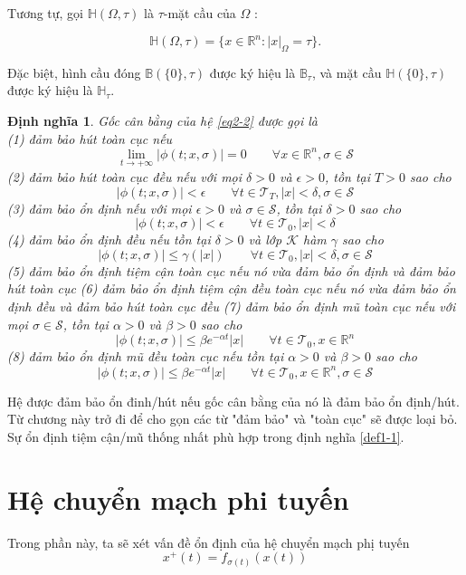 \documentclass[14pt,a4paper,oneside]{report}		%
\newtheorem{define}[theorem]{Định nghĩa}
\begin{document}
Tương tự, gọi $\mathbb{H}(\Omega,\tau)$ là $\tau$-mặt cầu của $\Omega$ :

$$\mathbb{H}(\Omega,\tau)=\{x\in\mathbb{R}^n:|x|_\Omega=\tau\}.$$

Đặc biệt, hình cầu đóng $\mathbb{B}(\{0\},\tau)$ được ký hiệu là $\mathbb{B}_\tau$, và mặt cầu $\mathbb{H}(\{0\},\tau)$ được ký hiệu là $\mathbb{H}_\tau$.

\begin{define}
Gốc cân bằng của hệ \ref{eq2-2} được gọi là\\
(1) đảm bảo hút toàn cục nếu
$$\lim_{t\rightarrow +\infty}|\phi (t;x,\sigma)|=0\qquad\forall x\in\mathbb{R}^n, \sigma\in\mathcal{S}$$
(2) đảm bảo hút toàn cục đều nếu với mọi $\delta >0$ và $\epsilon >0$, tồn tại $T>0$ sao cho
$$|\phi (t;x,\sigma)|<\epsilon\qquad\forall t\in\mathcal{T}_T, |x|<\delta,\sigma\in\mathcal{S}$$
(3) đảm bảo ổn định nếu với mọi $\epsilon > 0$ và $\sigma\in\mathcal{S}$, tồn tại $\delta >0$ sao cho
$$|\phi (t;x,\sigma)|<\epsilon\qquad\forall t\in\mathcal{T}_0, |x|<\delta$$
(4) đảm bảo ổn định đều nếu tồn tại $\delta > 0$ và lớp $\mathcal{K}$ hàm $\gamma$ sao cho
$$|\phi (t;x,\sigma)|\leq \gamma(|x|)\qquad\forall t\in\mathcal{T}_0, |x|<\delta,\sigma\in\mathcal{S}$$
(5) đảm bảo ổn định tiệm cận toàn cục nếu nó vừa đảm bảo ổn định và đảm bảo hút toàn cục
(6) đảm bảo ổn định tiệm cận đều toàn cục nếu nó vừa đảm bảo ổn định đều và đảm bảo hút toàn cục đều
(7) đảm bảo ổn định mũ toàn cục nếu với mọi $\sigma\in\mathcal{S}$, tồn tại $\alpha>0$ và $\beta >0$ sao cho
$$|\phi (t;x,\sigma)|\leq \beta e^{-\alpha t}|x|\qquad\forall t\in\mathcal{T}_0, x\in\mathbb{R}^n$$
(8) đảm bảo ổn định mũ đều toàn cục nếu tồn tại $\alpha>0$ và $\beta >0$ sao cho
$$|\phi (t;x,\sigma)|\leq \beta e^{-\alpha t}|x|\qquad\forall t\in\mathcal{T}_0, x\in\mathbb{R}^n, \sigma\in\mathcal{S}$$
\end{define}

Hệ được đảm bảo ổn đinh/hút nếu gốc cân bằng của nó là đảm bảo ổn định/hút. Từ chương này trở đi để cho gọn các từ "đảm bảo" và "toàn cục" sẽ được loại bỏ. Sự ổn định tiệm cận/mũ thống nhất phù hợp trong định nghĩa \ref{def1-1}.

\section{Hệ chuyển mạch phi tuyến}
Trong phần này, ta sẽ xét vấn đề ổn định của hệ chuyển mạch phị tuyến
\begin{equation} \label{eq2-6}
x^+(t)=f_{\sigma (t)}(x(t))
\end{equation}
\end{document}
